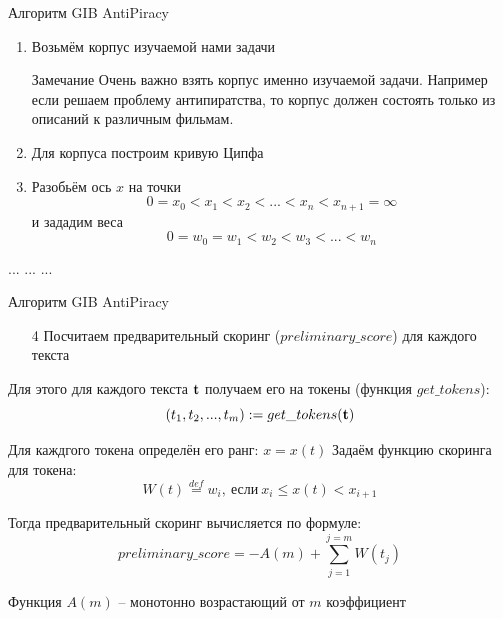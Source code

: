 \begin{frame}{Алгоритм GIB AntiPiracy}
	\begin{enumerate}
		\item 
		Возьмём корпус изучаемой нами задачи
		
		\begin{block}{Замечание}
		Очень важно взять корпус именно изучаемой задачи.
		Например если решаем проблему антипиратства, то корпус должен состоять 
		только из описаний к различным фильмам.
		\end{block}
		\item Для корпуса построим кривую Ципфа
		\item Разобьём ось $x$ на точки 
		\begin{equation}
		0 = x_0 < x_1 < x_2 < ... < x_n < x_{n+1} = \infty
		\end{equation}
		и зададим веса
		\begin{equation}
		0 = w_0 = w_1 < w_2 < w_3 < ... < w_n 
		\end{equation}
	\end{enumerate}
	... ... ...
\end{frame}

\begin{frame}{Алгоритм GIB AntiPiracy}
	\small
	\begin{enumerate}
		\item[4] Посчитаем предварительный скоринг ($preliminary\_score$) для каждого текста 
	\end{enumerate}
	
	Для этого для каждого текста $\bold t$ получаем его на токены (функция $get\_tokens$):
	\begin{equation}
		\left(t_1, t_2, ..., t_m\right) := get\_tokens (\bold t)
	\end{equation}
	
	Для каждгого токена определён его ранг: $x = x(t)$
	Задаём функцию скоринга для токена:
	\begin{equation}
	W(t) \stackrel{def}{=} w_i, ~\text{если}~ x_{i} \leqslant x(t) < x_{i+1}
	\end{equation}
	
	Тогда предварительный скоринг вычисляется по формуле:
	\begin{equation}
	preliminary\_score = -A(m) + \sum_{j=1}^{j=m} W(t_j)
	\end{equation}
	
	Функция $A(m)$ -- монотонно возрастающий от $m$ коэффициент
\end{frame}

